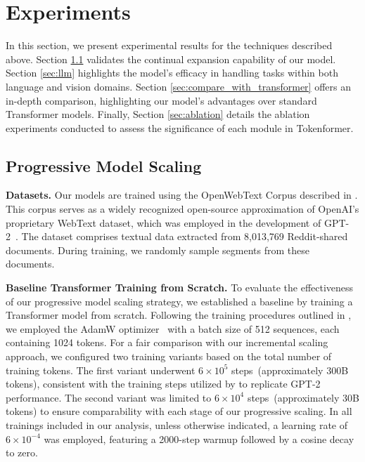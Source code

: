 \documentclass{article} %
\newcommand{\ourmethod}{Tokenformer\xspace}
\begin{document}
\section{Experiments} \label{sec:xp}
In this section, we present experimental results for the techniques described above. Section \ref{sec:progressive_scaling} validates the continual expansion capability of our model. Section \ref{sec:llm} highlights the model's efficacy in handling tasks within both language and vision domains. Section \ref{sec:compare_with_transformer} offers an in-depth comparison, highlighting our model's advantages over standard Transformer models. Finally, Section \ref{sec:ablation} details the ablation experiments conducted to assess the significance of each module in \ourmethod.
\subsection{Progressive Model Scaling} \label{sec:progressive_scaling}
\textbf{Datasets.}
Our models are trained using the OpenWebText Corpus described in \citep{Gokaslan2019OpenWeb}. This corpus serves as a widely recognized open-source approximation of OpenAI’s proprietary WebText dataset, which was employed in the development of GPT-2~\citep{radford2019language}. The dataset comprises textual data extracted from 8,013,769 Reddit-shared documents. During training, we randomly sample segments from these documents.

\textbf{Baseline Transformer Training from Scratch.} To evaluate the effectiveness of our progressive model scaling strategy, we established a baseline by training a Transformer model from scratch. Following the training procedures outlined in \citet{nanogpt,kaplan2020scaling}, we employed the AdamW optimizer~\citep{loshchilov2018decoupled} with a batch size of 512 sequences, each containing 1024 tokens. For a fair comparison with our incremental scaling approach, we configured two training variants based on the total number of training tokens. The first variant underwent $6 \times 10^5$ steps~(approximately 300B tokens), consistent with the training steps utilized by \citet{nanogpt} to replicate GPT-2 performance. The second variant was limited to $6 \times 10^4$ steps~(approximately 30B tokens) to ensure comparability with each stage of our progressive scaling. In all trainings included in our analysis, unless otherwise indicated, a learning rate of $6\times 10^{-4}$ was employed, featuring a 2000-step warmup followed by a cosine decay to zero.
\end{document}
